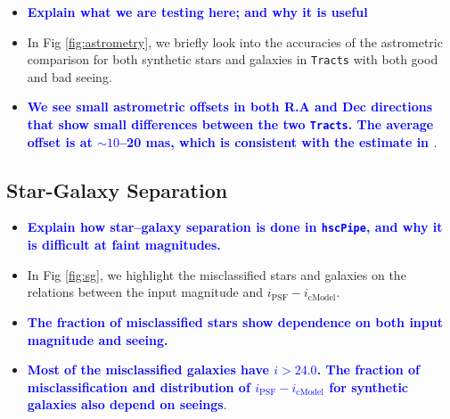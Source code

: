 \documentclass[useamsfonts]{pasj01}
\def\hscpipe{\texttt{hscPipe}}
\def\tracts{\texttt{Tracts}}
\newcommand{\plan}[1]{\textcolor{blue} {\textbf{#1}}}
\begin{document}
    \begin{itemize}
        
        \item \plan{Explain what we are testing here; and why it is useful}
        
        \item In Fig \ref{fig:astrometry}, we briefly look into the accuracies 
            of the astrometric comparison for both synthetic stars and galaxies in 
            \tracts{} with both good and bad seeing.
            
        \item \plan{We see small astrometric offsets in both R.A and Dec directions
            that show small differences between the two \tracts{}.
            The average offset is at ${\sim}10$--20 mas, which is consistent with 
            the estimate in \citet{HSCDR1}}.

    \end{itemize}

\subsection{Star-Galaxy Separation}
    \label{ssec:sg}

    \begin{itemize}
        
        \item \plan{Explain how star--galaxy separation is done in \hscpipe{}, and 
            why it is difficult at faint magnitudes.}
        
        \item In Fig \ref{fig:sg}, we highlight the misclassified stars and galaxies 
            on the relations between the input magnitude and 
            $i_{\mathrm{PSF}}-i_{\mathrm{cModel}}$.
            
        \item \plan{The fraction of misclassified stars show dependence on both 
            input magnitude and seeing.}
            
        \item \plan{Most of the misclassified galaxies have $i > 24.0$. 
            The fraction of misclassification and distribution of 
            $i_{\mathrm{PSF}}-i_{\mathrm{cModel}}$ for synthetic galaxies also depend on 
            seeings}.

    \end{itemize}
\end{document}
